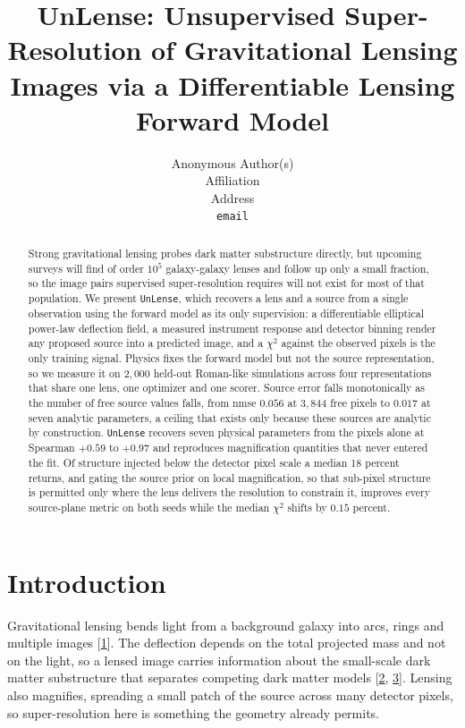 \documentclass{article}
\title{UnLense: Unsupervised Super-Resolution of Gravitational Lensing
Images via a Differentiable Lensing Forward Model}
\author{%
  Anonymous Author(s) \\
  Affiliation \\
  Address \\
  \texttt{email} \\
}
\newcommand{\rf}[1]{\hyperlink{ref#1}{#1}}
\begin{document}
\maketitle

\begin{abstract}
Strong gravitational lensing probes dark matter substructure directly, but
upcoming surveys will find of order $10^{5}$ galaxy-galaxy lenses and follow up
only a small fraction, so the image pairs supervised super-resolution requires
will not exist for most of that population. We present \texttt{UnLense}, which
recovers a lens and a source from a single observation using the forward model
as its only supervision: a differentiable elliptical power-law deflection field,
a measured instrument response and detector binning render any proposed source
into a predicted image, and a $\chi^{2}$ against the observed pixels is the only
training signal. Physics fixes the forward model but not the source
representation, so we measure it on $2{,}000$ held-out Roman-like simulations
across four representations that share one lens, one optimizer and one scorer.
Source error falls monotonically as the number of free source values falls, from
nmse $0.056$ at $3{,}844$ free pixels to $0.017$ at seven analytic parameters, a
ceiling that exists only because these sources are analytic by construction. \texttt{UnLense} recovers seven physical
parameters from the pixels alone at Spearman $+0.59$ to $+0.97$ and reproduces
magnification quantities that never entered the fit. Of structure injected below
the detector pixel scale a median 18 percent returns, and gating the source
prior on local magnification, so that sub-pixel structure is permitted only where
the lens delivers the resolution to constrain it, improves every source-plane
metric on both seeds while the median $\chi^{2}$ shifts by $0.15$ percent.
\end{abstract}

\section{Introduction}

Gravitational lensing bends light from a background galaxy into arcs, rings and
multiple images [\rf{1}]. The deflection depends on the total projected mass and
not on the light, so a lensed image carries information about the small-scale
dark matter substructure that separates competing dark matter models
[\rf{2}, \rf{3}]. Lensing also magnifies, spreading a small patch of the source
across many detector pixels, so super-resolution here is something the geometry
already permits.
\end{document}
